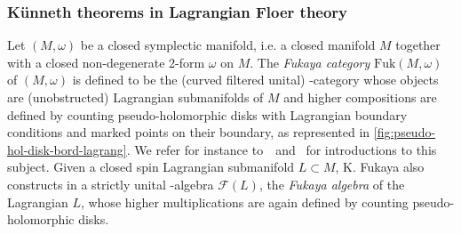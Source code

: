 \documentclass[twoside, 11pt]{amsart}
\theoremstyle{remark}
\begin{document}
\subsubsection{K\"unneth theorems in Lagrangian Floer theory}
\label{sss:amorim-fukaya}

Let $(M,\omega)$ be a closed symplectic manifold, i.e. a closed manifold $M$ together with a closed non-degenerate 2-form $\omega$ on $M$. 
The \emph{Fukaya category} $\mathrm{Fuk}(M,\omega)$ of $(M,\omega)$ is defined to be the (curved filtered unital) \Ainf -category whose objects are (unobstructed) Lagrangian submanifolds of $M$ and higher compositions are defined by counting pseudo-holomorphic disks with Lagrangian boundary conditions and marked points on their boundary, as represented in \cref{fig:pseudo-hol-disk-bord-lagrang}. 
We refer for instance to~\cite{smith-prolegomenon}~and~\cite{auroux-fukaya} for introductions to this subject.
Given a closed spin Lagrangian submanifold $L \subset M$, K. Fukaya also constructs in \cite{fukaya-cyclic-symmetry} a strictly unital \Ainf -algebra $\mathcal{F}(L)$, the \emph{Fukaya algebra} of the Lagrangian $L$, whose higher multiplications are again defined by counting pseudo-holomorphic disks. 
\end{document}
